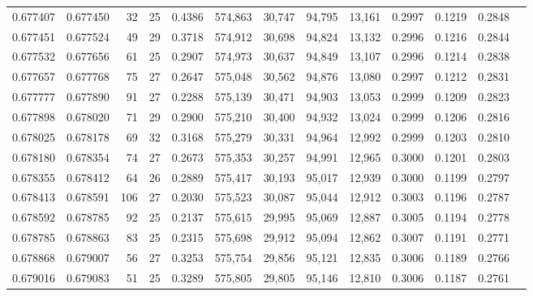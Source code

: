 \begin{tabular}{rrrrrrrrrrrrr}
0.677407 & 0.677450 &  32 &  25 &                                     0.4386 & 574,863 &  30,747 &  94,795 &  13,161 & 0.2997 & 0.1219 & 0.2848 \\
0.677451 & 0.677524 &  49 &  29 &                                     0.3718 & 574,912 &  30,698 &  94,824 &  13,132 & 0.2996 & 0.1216 & 0.2844 \\
0.677532 & 0.677656 &  61 &  25 &                                     0.2907 & 574,973 &  30,637 &  94,849 &  13,107 & 0.2996 & 0.1214 & 0.2838 \\
0.677657 & 0.677768 &  75 &  27 &                                     0.2647 & 575,048 &  30,562 &  94,876 &  13,080 & 0.2997 & 0.1212 & 0.2831 \\
0.677777 & 0.677890 &  91 &  27 &                                     0.2288 & 575,139 &  30,471 &  94,903 &  13,053 & 0.2999 & 0.1209 & 0.2823 \\
0.677898 & 0.678020 &  71 &  29 &                                     0.2900 & 575,210 &  30,400 &  94,932 &  13,024 & 0.2999 & 0.1206 & 0.2816 \\
0.678025 & 0.678178 &  69 &  32 &                                     0.3168 & 575,279 &  30,331 &  94,964 &  12,992 & 0.2999 & 0.1203 & 0.2810 \\
0.678180 & 0.678354 &  74 &  27 &                                     0.2673 & 575,353 &  30,257 &  94,991 &  12,965 & 0.3000 & 0.1201 & 0.2803 \\
0.678355 & 0.678412 &  64 &  26 &                                     0.2889 & 575,417 &  30,193 &  95,017 &  12,939 & 0.3000 & 0.1199 & 0.2797 \\
0.678413 & 0.678591 & 106 &  27 &                                     0.2030 & 575,523 &  30,087 &  95,044 &  12,912 & 0.3003 & 0.1196 & 0.2787 \\
0.678592 & 0.678785 &  92 &  25 &                                     0.2137 & 575,615 &  29,995 &  95,069 &  12,887 & 0.3005 & 0.1194 & 0.2778 \\
0.678785 & 0.678863 &  83 &  25 &                                     0.2315 & 575,698 &  29,912 &  95,094 &  12,862 & 0.3007 & 0.1191 & 0.2771 \\
0.678868 & 0.679007 &  56 &  27 &                                     0.3253 & 575,754 &  29,856 &  95,121 &  12,835 & 0.3006 & 0.1189 & 0.2766 \\
0.679016 & 0.679083 &  51 &  25 &                                     0.3289 & 575,805 &  29,805 &  95,146 &  12,810 & 0.3006 & 0.1187 & 0.2761 \\

\end{tabular}
